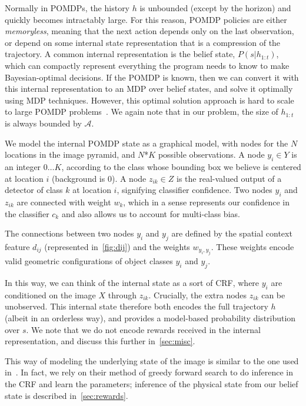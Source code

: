 Normally in POMDPs, the history $h$ is unbounded (except by the horizon) and quickly becomes intractably large.
For this reason, POMDP policies are either \emph{memoryless}, meaning that the next action depends only on the last observation, or depend on some internal state representation that is a compression of the trajectory.
A common internal representation is the belief state, $P(s|h_{1:t})$, which can compactly represent everything the program needs to know to make Bayesian-optimal decisions.
If the POMDP is known, then we can convert it with this internal representation to an MDP over belief states, and solve it optimally using MDP techniques.
However, this optimal solution approach is hard to scale to large POMDP problems~\cite{Murphy2000,Ng2000}.
We again note that in our problem, the size of $h_{1:t}$ is always bounded by $\mathcal A$.

We model the internal POMDP state as a graphical model, with nodes for the $N$ locations in the image pyramid, and $N$*$K$ possible observations.
A node $y_{i} \in Y$ is an integer $0 \dots K$, according to the class whose bounding box we believe is centered at location $i$ (background is $0$).
A node $z_{ik} \in Z$ is the real-valued output of a detector of class $k$ at location $i$, signifying classifier confidence.
Two nodes $y_i$ and $z_{ik}$ are connected with weight $w_{k}$, which in a sense represents our confidence in the classifier $c_k$ and also allows us to account for multi-class bias.

The connections between two nodes $y_i$ and $y_j$ are defined by the spatial context feature $d_{ij}$ (represented in~\autoref{fig:dij}) and the weights $w_{y_i,y_j}$.
These weights encode valid geometric configurations of object classes $y_i$ and $y_j$.


In this way, we can think of the internal state as a sort of CRF, where $y_i$ are conditioned on the image $X$ through $z_{ik}$.
Crucially, the extra nodes $z_{ik}$ can be unobserved.
This internal state therefore both encodes the full trajectory $h$ (albeit in an orderless way), and provides a model-based probability distribution over $s$.
We note that we do not encode rewards received in the internal representation, and discuss this further in~\autoref{sec:misc}.

This way of modeling the underlying state of the image is similar to the one used in~\cite{Desai2009}.
In fact, we rely on their method of greedy forward search to do inference in the CRF and learn the parameters; inference of the physical state from our belief state is described in~\autoref{sec:rewards}.

